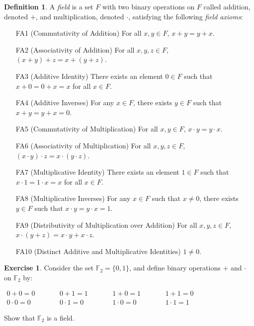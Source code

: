 \documentclass[12pt]{article}
\newcommand{\bbF}{\mathbb{F}}
\renewcommand{\_}[1]{\underline{ #1 }}
\theoremstyle{definition}
\newtheorem{definition}[theorem]{Definition}
\newtheorem{exercise}[theorem]{Exercise}
\numberwithin{equation}{subsection}
\begin{document}
\begin{definition}  A \emph{field} is a set $F$ with two binary operations  on $F$ called addition,
denoted $+$, and multiplication, denoted $\cdot$\;, satisfying the following \emph{field axioms}:
\begin{itemize}
\item[FA1]  (Commutativity of Addition)  For all $x,y\in F$, $x + y = y + x$.
\item[FA2]  (Associativity of Addition)  For all $x,y,z\in F$, $(x + y) + z = x + (y + z)$.
\item[FA3]  (Additive Identity)  There exists an element $0 \in F$ such that $x + 0 = 0 + x = x$ for all $x \in F$.
\item[FA4]  (Additive Inverses)  For any $x \in F$, there exists $y \in F$ such that $x + y = y + x = 0$.
\item[FA5]  (Commutativity of Multiplication)  For all $x,y\in F$, $x \cdot y = y \cdot x$.
\item[FA6]  (Associativity of Multiplication)  For all $x, y, z \in F$, $(x \cdot y) \cdot z = x \cdot (y \cdot z)$.
\item[FA7]  (Multiplicative Identity)  There exists an element $1 \in F$ such that $x \cdot 1 = 1 \cdot x = x$ for all $x \in F$.
\item[FA8]  (Multiplicative Inverses)  For any $x \in F$ such that $x \neq 0$, there exists $y \in F$ such that $x \cdot y = y \cdot x = 1$.
\item[FA9]  (Distributivity of Multiplication over Addition)  For all $x, y, z \in F$,
$x \cdot(y + z) = x \cdot y + x \cdot z$. 
\item[FA10]  (Distinct Additive and Multiplicative Identities)  $1 \neq 0$.
\end{itemize}
\end{definition}

\begin{exercise}  Consider the set $\bbF_{2} = \{0, 1\}$, and define binary operations $+$ and $\cdot$ on $\bbF_{2}$ by:

\begin{center}
$
\begin{array}{ccccccc}
0 + 0 = 0 & \phantom{MM} & 0 + 1 = 1 & \phantom{MM} & 1 + 0 = 1 & \phantom{MM} &1 + 1 = 0 \\
0 \cdot 0 = 0 & \phantom{MM} & 0 \cdot 1 = 0 & \phantom{MM}  & 1\cdot 0 =0 & \phantom{MM} &1 \cdot 1 = 1 
\end{array}
$
\end{center}

Show that $\bbF_{2}$ is a field.  
\end{exercise}
\end{document}

